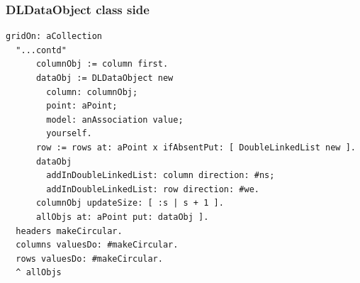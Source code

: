 \documentclass[10pt]{beamer}
\begin{document}
\begin{frame}[fragile]
\frametitle{DLDataObject class side}
\begin{verbatim}
gridOn: aCollection
  "...contd"
      columnObj := column first.
      dataObj := DLDataObject new
        column: columnObj;
        point: aPoint;
        model: anAssociation value;
        yourself.
      row := rows at: aPoint x ifAbsentPut: [ DoubleLinkedList new ].
      dataObj
        addInDoubleLinkedList: column direction: #ns;
        addInDoubleLinkedList: row direction: #we.
      columnObj updateSize: [ :s | s + 1 ].
      allObjs at: aPoint put: dataObj ].
  headers makeCircular.
  columns valuesDo: #makeCircular.
  rows valuesDo: #makeCircular.
  ^ allObjs
\end{verbatim}
\end{frame}
\end{document}
